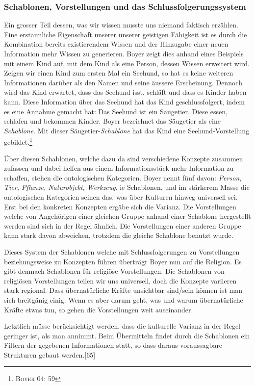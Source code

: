 \subsubsection*{Schablonen, Vorstellungen und das Schlussfolgerungssystem}
Ein grosser Teil dessen, was wir wissen musste uns niemand faktisch erzählen. Eine erstaunliche Eigenschaft unserer unserer geistigen Fähigkeit ist es durch die Kombination bereits existierendem Wissen und der Hinzugabe einer neuen Information mehr Wissen zu generieren. Boyer zeigt dies anhand eines Beispiels mit einem Kind auf, mit dem Kind als eine Person, dessen Wissen erweitert wird. Zeigen wir einen Kind zum ersten Mal ein Seehund, so hat es keine weiteren Informationen darüber als den Namen und seine äussere Erscheinung. Dennoch wird das Kind erwartet, dass das Seehund isst, schläft und dass es Kinder haben kann. Diese Information über das Seehund hat das Kind geschlussfolgert, indem es eine Annahme gemacht hat: Das Seehund ist ein Säugetier. Diese essen, schlafen und bekommen Kinder. Boyer bezeichnet das Säugetier als eine \emph{Schablone}. Mit dieser Säugetier-\emph{Schablone} hat das Kind eine Seehund-Vorstellung gebildet.\footnote{\textsc{Boyer 04: 59}}   

Über diesen Schablonen, welche dazu da sind verschiedene Konzepte zusammen zufassen und dabei helfen aus einem Informationsstück mehr Information zu schaffen, stehen die ontologischen Kategorien. Boyer nennt fünf davon: \emph{Person, Tier, Pflanze, Naturobjekt, Werkzeug}. ie Schablonen, und im stärkerem Masse die ontologischen Kategorien seinen das, was über Kulturen hinweg universell sei. Erst bei den konkreten Konzepten ergäbe sich die Varianz. Die Vorstellungen welche von Angehörigen einer gleichen Gruppe anhand einer Schablone hergestellt werden sind sich in der Regel ähnlich. Die Vorstellungen einer anderen Gruppe kann stark davon abweichen, trotzdem die gleiche Schablone benutzt wurde.

Dieses System der Schablonen welche mit Schlussfolgerungen zu Vorstellungen beziehungsweise zu Konzepten führen überträgt Boyer nun auf die Religion. Es gibt demnach Schablonen für religiöse Vorstellungen. Die Schablonen von religiösen Vorstellungen teilen wir uns universell, doch die Konzepte variieren stark regional. Dass übernatürliche Kräfte unsichtbar sind/sein können ist man sich breitgänig einig. Wenn es aber darum geht, was und warum übernatürliche Kräfte etwas tun, so gehen die Vorstellungen weit auseinander.

Letztlich müsse berücksichtigt werden, dass die kulturelle Varianz in der Regel geringer ist, als man annimmt. Beim Übermitteln findet durch die Schablonen ein Filtern der gegebenen Informationen statt, so dass daraus voraussagbare Strukturen gebaut werden.[65]

